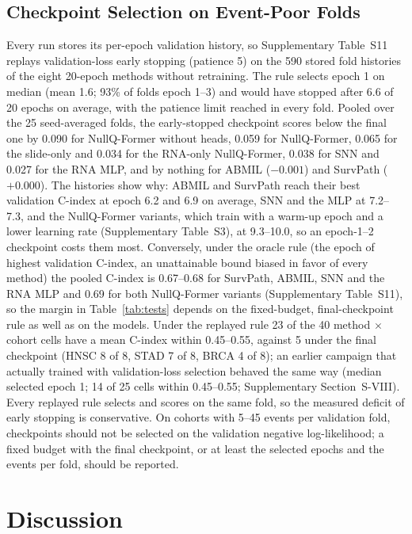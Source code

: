 \documentclass[journal]{IEEEtran}
\newcommand{\pq}{NullQ-Former}
\newcommand{\cindex}{C-index}
\begin{document}
\subsection{Checkpoint Selection on Event-Poor Folds}
\label{sec:selection}
Every run stores its per-epoch validation history, so Supplementary Table~S11 replays validation-loss early stopping (patience 5) on the 590 stored fold histories of the eight 20-epoch methods without retraining. The rule selects epoch 1 on median (mean 1.6; 93\% of folds epoch 1--3) and would have stopped after 6.6 of 20 epochs on average, with the patience limit reached in every fold. Pooled over the 25 seed-averaged folds, the early-stopped checkpoint scores below the final one by 0.090 for \pq{} without heads, 0.059 for \pq{}, 0.065 for the slide-only and 0.034 for the RNA-only \pq{}, 0.038 for SNN and 0.027 for the RNA MLP, and by nothing for ABMIL ($-0.001$) and SurvPath ($+0.000$). The histories show why: ABMIL and SurvPath reach their best validation \cindex{} at epoch 6.2 and 6.9 on average, SNN and the MLP at 7.2--7.3, and the \pq{} variants, which train with a warm-up epoch and a lower learning rate (Supplementary Table~S3), at 9.3--10.0, so an epoch-1--2 checkpoint costs them most. Conversely, under the oracle rule (the epoch of highest validation \cindex{}, an unattainable bound biased in favor of every method) the pooled \cindex{} is 0.67--0.68 for SurvPath, ABMIL, SNN and the RNA MLP and 0.69 for both \pq{} variants (Supplementary Table~S11), so the margin in Table~\ref{tab:tests} depends on the fixed-budget, final-checkpoint rule as well as on the models. Under the replayed rule 23 of the 40 method $\times$ cohort cells have a mean \cindex{} within 0.45--0.55, against 5 under the final checkpoint (HNSC 8 of 8, STAD 7 of 8, BRCA 4 of 8); an earlier campaign that actually trained with validation-loss selection behaved the same way (median selected epoch 1; 14 of 25 cells within 0.45--0.55; Supplementary Section~S-VIII). Every replayed rule selects and scores on the same fold, so the measured deficit of early stopping is conservative. On cohorts with 5--45 events per validation fold, checkpoints should not be selected on the validation negative log-likelihood; a fixed budget with the final checkpoint, or at least the selected epochs and the events per fold, should be reported.

\section{Discussion}
\label{sec:discussion}
\end{document}

